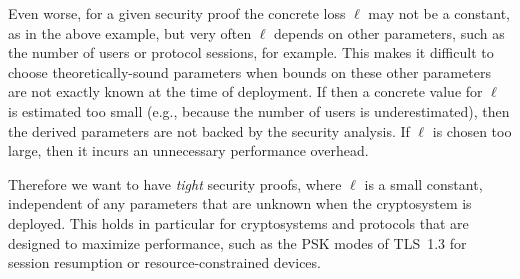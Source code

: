 Even worse, for a given security proof the concrete loss $\ell$ may not be a constant, as in the above example, but very often $\ell$ depends on other parameters, such as the number of users or protocol sessions, for example.
This makes it difficult to choose theoretically-sound parameters when bounds on these other parameters are not exactly known at the time of deployment.
If then a concrete value for $\ell$ is estimated too small (e.g., because the number of users is underestimated), then the derived parameters are not backed by the security analysis.
If $\ell$ is chosen too large, then it incurs an unnecessary performance overhead.

Therefore we want to have \emph{tight} security proofs, where $\ell$ is a small constant, independent of any parameters that are unknown when the cryptosystem is deployed. This holds in particular for cryptosystems and protocols that are designed to maximize performance, such as the PSK modes of TLS~1.3 for session resumption or resource-constrained devices.


